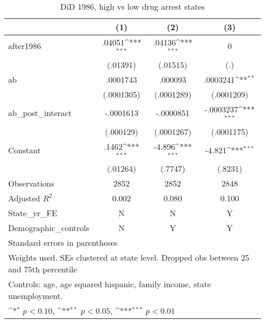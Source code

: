 \begin{table}[htbp]\centering
\def\sym#1{\ifmmode^{#1}\else\(^{#1}\)\fi}
\caption{DiD 1986, high vs low drug arrest states}
\begin{tabular}{l*{3}{c}}
\hline\hline
                    &\multicolumn{1}{c}{(1)}         &\multicolumn{1}{c}{(2)}         &\multicolumn{1}{c}{(3)}         \\
\hline
after1986           &      .04051\sym{***}&      .04136\sym{***}&           0         \\
                    &    (.01391)         &    (.01515)         &         (.)         \\
[1em]
ab                  &    .0001743         &     .000093         &    .0003241\sym{**} \\
                    &  (.0001305)         &  (.0001289)         &  (.0001209)         \\
[1em]
ab\_post\_interact    &   -.0001613         &   -.0000851         &   -.0003237\sym{***}\\
                    &   (.000129)         &  (.0001267)         &  (.0001175)         \\
[1em]
Constant            &       .1462\sym{***}&      -4.896\sym{***}&      -4.821\sym{***}\\
                    &    (.01264)         &     (.7747)         &     (.8231)         \\
\hline
Observations        &        2852         &        2852         &        2848         \\
Adjusted \(R^{2}\)  &       0.002         &       0.080         &       0.100         \\
State\_yr\_FE         &           N         &           N         &           Y         \\
Demographic\_controls&           N         &           Y         &           Y         \\
\hline\hline
\multicolumn{4}{l}{\footnotesize Standard errors in parentheses}\\
\multicolumn{4}{l}{\footnotesize Weights used. SEs clustered at state level. Dropped obs between 25 and 75th percentile}\\
\multicolumn{4}{l}{\footnotesize Controls: age, age squared hispanic, family income, state unemployment.}\\
\multicolumn{4}{l}{\footnotesize \sym{*} \(p<0.10\), \sym{**} \(p<0.05\), \sym{***} \(p<0.01\)}\\
\end{tabular}
\end{table}
